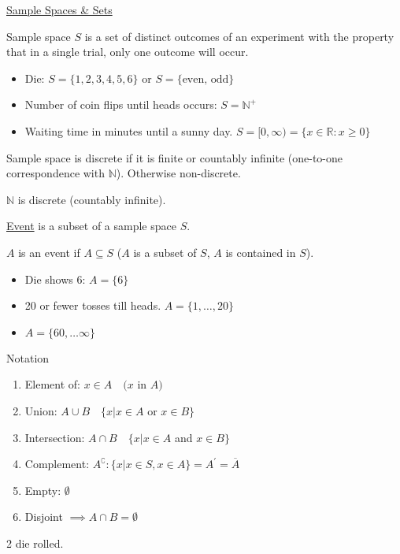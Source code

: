 \documentclass{article}
\begin{document}
\underline{Sample Spaces \& Sets}

Sample space $S$ is a set of distinct outcomes of an experiment with the property that in a single trial, only one outcome will occur. 
\begin{itemize}
    \item Die: $S = \{1,2,3,4,5,6\}$ or $S = \{\text{even, odd}\}$
    \item Number of coin flips until heads occurs: $S = \mathbb{N}^+$
    \item Waiting time in minutes until a sunny day. $S = [0, \infty) = \{x \in \mathbb{R}: x \ge 0\}$
\end{itemize}

Sample space is discrete if it is finite or countably infinite (one-to-one correspondence with $\mathbb{N}$). Otherwise non-discrete. 

$\mathbb{N}$ is discrete (countably infinite). 

\underline{Event} is a subset of a sample space $S$. 

$A$ is an event if $A \subseteq S$ ($A$ is a subset of $S$, $A$ is contained in $S$). 
\begin{itemize}
    \item Die shows 6: $A = \{6\}$
    \item 20 or fewer tosses till heads. $A = \{1,\ldots,20\}$
    \item $A = \{60,\ldots \infty\}$
\end{itemize}

Notation
\begin{enumerate}
    \item Element of: $x \in A \quad (x$ in $A)$
    \item Union: $A \cup B \quad \{x | x \in A$ or $x \in B\}$
    \item Intersection: $A \cap B \quad \{x | x \in A$ and $x \in B\}$
    \item Complement: $A^\complement: \{x | x \in S, x \in A\} = A^{\prime} = \overline{A}$
    \item Empty: $\emptyset$
    \item Disjoint $\implies A \cap B = \emptyset$
\end{enumerate}

2 die rolled. 
\end{document}

